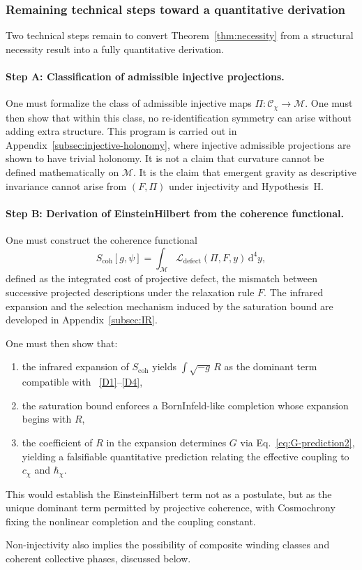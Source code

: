   \subsubsection*{Remaining technical steps toward a quantitative derivation}
    \label{subsec:necessity-open}

    Two technical steps remain to convert Theorem~\ref{thm:necessity} from a structural necessity result into a fully
    quantitative derivation.

    \paragraph{Step A: Classification of admissible injective projections.}
      One must formalize the class of admissible injective maps
      $\Pi : \mathcal{C}_\chi \to \mathcal{M}$.
      One must then show that within this class, no re-identification symmetry can arise
      without adding extra structure.
      This program is carried out in Appendix~\ref{subsec:injective-holonomy},
      where injective admissible projections are shown to have trivial holonomy.
      It is not a claim that curvature cannot be defined mathematically on $\mathcal{M}$.
      It is the claim that emergent gravity as descriptive invariance cannot arise from
      $(F, \Pi)$ under injectivity and Hypothesis~H.

    \paragraph{Step B: Derivation of Einstein\textendash Hilbert from the coherence functional.}
      One must construct the coherence functional
    \begin{equation}
      S_{\mathrm{coh}}[g, \psi]
      =
      \int_{\mathcal{M}} \mathcal{L}_{\mathrm{defect}}(\Pi, F, y)\, \mathrm{d}^4 y,
      \label{eq:EH-result}
      \end{equation}
      defined as the integrated cost of projective defect,
      the mismatch between successive projected descriptions under the relaxation rule $F$.
      The infrared expansion and the selection mechanism induced by the saturation bound
      are developed in Appendix~\ref{subsec:IR}.

      One must then show that:
    \begin{enumerate}
      \item the infrared expansion of $S_{\mathrm{coh}}$ yields $\int \sqrt{-g}\, R$
      as the dominant term compatible with
      ~\ref{D1}--\ref{D4},
      \item the saturation bound enforces a Born\textendash Infeld-like completion whose expansion begins with $R$,
      \item the coefficient of $R$ in the expansion determines $G$ via Eq.~\ref{eq:G-prediction2},
      yielding a falsifiable quantitative prediction relating the effective coupling to $c_\chi$ and $\hbar_\chi$.
      \end{enumerate}
      This would establish the Einstein\textendash Hilbert term not as a postulate,
      but as the unique dominant term permitted by projective coherence, with Cosmochrony fixing the nonlinear
      completion and the coupling constant.

      Non-injectivity also implies the possibility of composite winding classes and coherent collective phases,
      discussed below.
